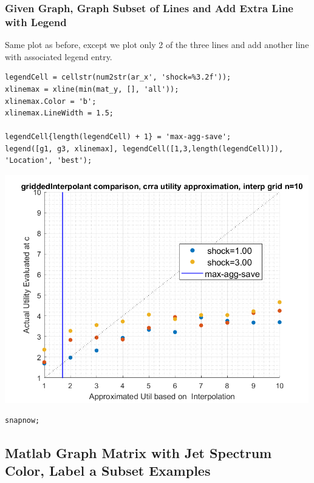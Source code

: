 \documentclass[
]{book}
\begin{document}
\hypertarget{given-graph-graph-subset-of-lines-and-add-extra-line-with-legend}{%
\subsubsection{Given Graph, Graph Subset of Lines and Add Extra Line with Legend}\label{given-graph-graph-subset-of-lines-and-add-extra-line-with-legend}}

Same plot as before, except we plot only 2 of the three lines and add
another line with associated legend entry.

\begin{verbatim}
legendCell = cellstr(num2str(ar_x', 'shock=%3.2f'));
xlinemax = xline(min(mat_y, [], 'all'));
xlinemax.Color = 'b';
xlinemax.LineWidth = 1.5;

legendCell{length(legendCell) + 1} = 'max-agg-save';
legend([g1, g3, xlinemax], legendCell([1,3,length(legendCell)]), 'Location', 'best');
\end{verbatim}

\includegraphics[width=5.20833in,height=\textheight]{img/fs_titling_images/figure_2.png}

\begin{verbatim}
snapnow;
\end{verbatim}

\hypertarget{matlab-graph-matrix-with-jet-spectrum-color-label-a-subset-examples}{%
\subsection{Matlab Graph Matrix with Jet Spectrum Color, Label a Subset Examples}\label{matlab-graph-matrix-with-jet-spectrum-color-label-a-subset-examples}}
\end{document}
